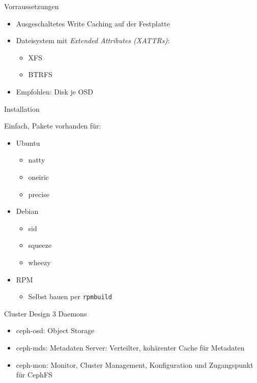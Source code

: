\documentclass[hyperref={xetex}]{beamer}
\begin{document}
\begin{frame}{Vorraussetzungen}
	\begin{itemize}
		\item Ausgeschaltetes Write Caching auf der Festplatte
		\item Dateisystem mit \emph{Extended Attributes (XATTRs)}:
		\begin{itemize}
			\item XFS
			\item BTRFS
		\end{itemize}
		\item Empfohlen: Disk je OSD

	\end{itemize}
\end{frame}



\begin{frame}{Installation}

	Einfach, Pakete vorhanden f\"ur:
	\begin{itemize}
		\item Ubuntu
		\begin{itemize}
			\item natty
			\item oneiric
			\item precise
		\end{itemize}
		\item Debian
		\begin{itemize}
			\item sid
			\item squeeze
			\item wheezy
		\end{itemize}
		\item RPM 
		\begin{itemize}
			\item Selbst bauen per \texttt{rpmbuild}
		\end{itemize}
	\end{itemize}

\end{frame}


\begin{frame}{Cluster Design}
	3 Daemons
	\begin{itemize}
        \item \alert{ceph-osd}: Object Storage
        \item \alert{ceph-mds}: Metadaten Server: Verteilter, koh\"arenter Cache f\"ur Metadaten %
        \item \alert{ceph-mon}: Monitor, Cluster Management, Konfiguration und Zugangspunkt f\"ur CephFS
	\end{itemize}
\end{frame}
\end{document}
